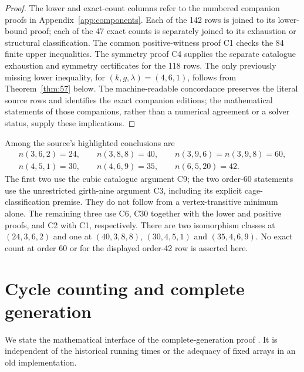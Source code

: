 \documentclass[11pt,a4paper]{article}
\begin{document}
\begin{proof}
The lower and exact-count columns refer to the numbered companion
proofs in Appendix~\ref{app:components}. Each of the 142 rows is joined
to its lower-bound proof; each of the 47 exact counts is separately
joined to its exhaustion or structural classification. The common
positive-witness proof C1 checks the 84 finite upper inequalities.
The symmetry proof C4 supplies the separate catalogue exhaustion and
symmetry certificates for the 118 rows. The only previously missing
lower inequality, for $(k,g,\lambda)=(4,6,1)$, follows from
Theorem~\ref{thm:57} below. The machine-readable concordance preserves
the literal source rows and identifies the exact companion editions;
the mathematical statements of those companions, rather than a numerical
agreement or a solver status, supply these implications.
\end{proof}

Among the source's highlighted conclusions are
\[
\begin{gathered}
n(3,6,2)=24,\qquad n(3,8,8)=40,\qquad
n(3,9,6)=n(3,9,8)=60,\\
n(4,5,1)=30,\qquad n(4,6,9)=35,\qquad n(6,5,20)=42.
\end{gathered}
\]
The first two use the cubic catalogue argument C9; the two order-60
statements use the unrestricted girth-nine argument C3, including its
explicit cage-classification premise. They do not follow from a
vertex-transitive minimum alone. The remaining three use C6, C30
together with the lower and positive proofs, and C2 with C1,
respectively. There are two isomorphism classes at $(24,3,6,2)$ and one
at $(40,3,8,8)$, $(30,4,5,1)$ and $(35,4,6,9)$. No exact count at order
60 or for the displayed order-42 row is asserted here.

\section{Cycle counting and complete generation}\label{sec:algorithm}
We state the mathematical interface of the complete-generation proof
\cite{algorithm}. It is independent of the historical running times or
the adequacy of fixed arrays in an old implementation.
\end{document}
